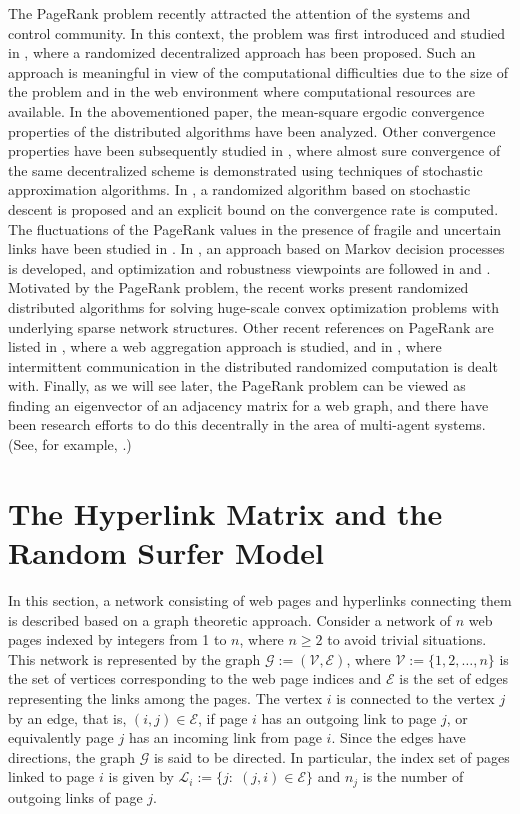 \documentclass[11pt,draftcls,onecolumn]{IEEEtran}
\begin{document}
The PageRank problem recently attracted the attention of the systems and control community. 
In this context, the problem was first introduced and studied in \cite{IshTem:10}, where 
a randomized decentralized approach has been proposed. Such an approach is meaningful
in view of the computational difficulties due to the size of the problem and in the
web environment where computational resources are available. 
In the abovementioned paper, the mean-square ergodic convergence properties of 
the distributed algorithms have been analyzed. 
Other convergence properties have been 
subsequently studied in \cite{ZhaChFa:13}, where almost sure convergence of the same 
decentralized scheme is demonstrated using techniques of stochastic approximation algorithms.
In \cite{NazPol:11}, a randomized algorithm based on stochastic descent is proposed 
and an explicit bound on the convergence rate is computed. 
The fluctuations of the PageRank values in the presence of fragile and uncertain 
links have been studied in \cite{IshTem_sice:09}. 
In \cite{CsaJunBlo:09}, an approach based on 
Markov decision processes is developed, and optimization and robustness viewpoints are followed 
in \cite{FABG:13} and \cite{JudPol:12}.
Motivated by the PageRank problem, the recent works \cite{Nesterov:12,Necoara:13} present
randomized distributed algorithms for solving 
huge-scale convex optimization problems with underlying sparse network structures.
Other recent references on PageRank are listed in \cite{IshTemBai:12},
where a web aggregation approach is studied, and in \cite{IshTemBai_scl:12}, where
intermittent communication in the distributed randomized computation is dealt with.
Finally, as we will see later, the PageRank problem can be viewed as finding
an eigenvector of an adjacency matrix for a web graph, 
and there have been research efforts to do this decentrally in the 
area of multi-agent systems. (See, for example, \cite{KibCom:12}.)




\section*{The Hyperlink Matrix and the Random Surfer Model}

In this section, a network consisting of web pages and hyperlinks connecting them
is described based on a graph theoretic approach.
Consider a network of $n$ web pages indexed by integers from 1 to $n$, where
$n\geq 2$ to avoid trivial situations.
This network is represented by the graph $\mathcal{G}:=(\mathcal{V},\mathcal{E})$,
where $\mathcal{V}:=\{1,2,\ldots,n\}$ is the set of vertices corresponding 
to the web page indices and $\mathcal{E}$ is the set of edges representing
the links among the pages. 
The vertex $i$ is connected to the vertex $j$ by an edge, that is,
$(i,j)\in \mathcal{E}$, if page $i$ has an outgoing link to page $j$,
or equivalently page $j$ has an incoming link from page $i$.
Since the edges have directions, the graph $\mathcal{G}$ is said to be directed.
In particular, the index set of pages linked to page $i$ is given by $\mathcal{L}_i:=\{j:\; (j,i)\in\mathcal{E}\}$ and $n_j$ is the number of outgoing links of page $j$. 
\end{document}

